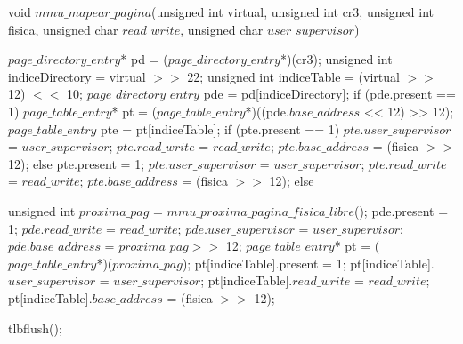 \begin{algorithmic}
    \State \tab void $mmu\_mapear\_pagina$(unsigned int virtual, unsigned int cr3, \State \tab unsigned int fisica, unsigned char $read\_write$, unsigned char $user\_supervisor$) {

  \State \tab \tab $page\_directory\_entry$* pd = ($page\_directory\_entry$*)(cr3);
  \State \tab \tab unsigned int indiceDirectory = virtual $>>$ 22;
  \State \tab \tab unsigned int indiceTable = (virtual $>>$ 12) $<<$ 10;
  \State \tab \tab $page\_directory\_entry$ pde = pd[indiceDirectory];
  \State \tab \tab if (pde.present == 1) {
    \State \tab \tab \tab $page\_table\_entry$* pt = ($page\_table\_entry$*)((pde.$base\_address$ << 12) >> 12);
    \State \tab \tab \tab $page\_table\_entry$ pte = pt[indiceTable];
    \State \tab \tab \tab if (pte.present == 1) {
      \State \tab \tab \tab \tab $pte.user\_supervisor$ = $user\_supervisor$;
      \State \tab \tab \tab \tab $pte.read\_write$ = $read\_write$;
      \State \tab \tab \tab \tab $pte.base\_address$ = (fisica $>>$ 12);
    \State \tab \tab \tab } else {
      \State \tab \tab \tab \tab pte.present = 1;
      \State \tab \tab \tab \tab $pte.user\_supervisor$ = $user\_supervisor$;
      \State \tab \tab \tab \tab $pte.read\_write$ = $read\_write$;
      \State \tab \tab \tab \tab $pte.base\_address$ = (fisica $>>$ 12);
    \State \tab \tab \tab }
  \State \tab \tab } else {
    \State \tab \tab \tab unsigned int $proxima\_pag$ = $mmu\_proxima\_pagina\_fisica\_libre$();
    \State \tab \tab \tab pde.present = 1;
    \State \tab \tab \tab $pde.read\_write$ = $read\_write$;
    \State \tab \tab \tab $pde.user\_supervisor$ = $user\_supervisor$;
    \State \tab \tab \tab $pde.base\_address$ = $proxima\_pag >>$ 12;
    \State \tab \tab \tab $page\_table\_entry$* pt = ($page\_table\_entry$*)($proxima\_pag$);
    \State \tab \tab \tab pt[indiceTable].present = 1;
    \State \tab \tab \tab pt[indiceTable].$user\_supervisor$ = $user\_supervisor$;
    \State \tab \tab \tab pt[indiceTable].$read\_write$ = $read\_write$;
    \State \tab \tab \tab pt[indiceTable].$base\_address$ = (fisica $>>$ 12);

\State \tab \tab  }

  \State \tab \tab tlbflush();
\State \tab }



\end{algorithmic}


